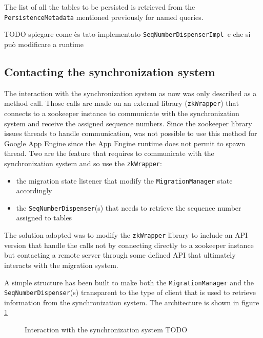 \noindent The list of all the tables to be persisted is retrieved from the \texttt{PersistenceMetadata} mentioned previously for named queries.

\newparagraph TODO spiegare come ès tato implementato \texttt{SeqNumberDispenserImpl }e che si può modificare a runtime
 
\subsection{Contacting the synchronization system}
The interaction with the synchronization system as now was only described as a method call. Those calls are made on an external library (\texttt{zkWrapper}) that connects to a zookeeper instance to communicate with the synchronization system and receive the assigned sequence numbers.
Since the zookeeper library issues threads to handle communication, was not possible to use this method for Google App Engine since the App Engine runtime does not permit to spawn thread.
Two are the feature that requires to communicate with the synchronization system and so use the \texttt{zkWrapper}:
\begin{itemize}
\item the migration state listener that modify the \texttt{MigrationManager} state accordingly
\item the \texttt{SeqNumberDispenser}(s) that needs to retrieve the sequence number assigned to tables
\end{itemize} 
\noindent The solution adopted was to modify the \texttt{zkWrapper} library to include an API version that handle the calls not by connecting directly to a zookeeper instance but contacting a remote server through some defined API that ultimately interacts with the migration system.

\newparagraph A simple structure has been built to make both the \texttt{MigrationManager} and the \texttt{SeqNumberDispenser}(s) transparent to the type of client that is used to retrieve information from the synchronization system. The architecture is shown in figure \ref{fig:zk-adapter}

\begin{figure}[tbh]
  \centering
  \begin{minipage}[c][0.33\textheight][c]{0.5\textwidth}
  \end{minipage}
  \caption{Interaction with the synchronization system TODO}
  \label{fig:zk-adapter}
\end{figure} 

